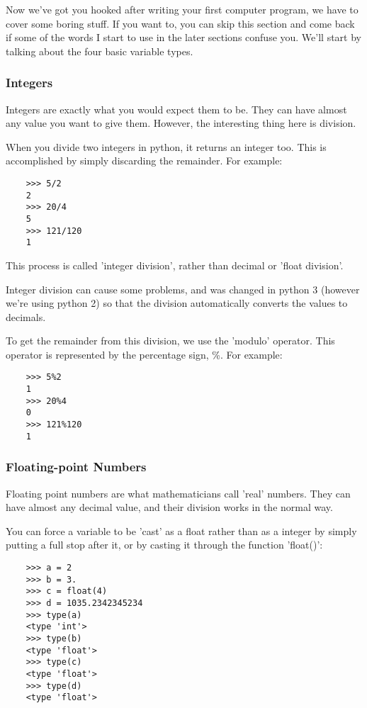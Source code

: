 Now we've got you hooked after writing your first computer program, we have to
cover some boring stuff. If you want to, you can skip this section and come back
if some of the words I start to use in the later sections confuse you. We'll
start by talking about the four basic variable types.

\subsubsection{Integers}

Integers are exactly what you would expect them to be. They can have almost any
value you want to give them. However, the interesting thing here is division.

When you divide two integers in python, it returns an integer too. This is
accomplished by simply discarding the remainder. For example:

\begin{lstlisting}
    >>> 5/2
    2
    >>> 20/4
    5
    >>> 121/120
    1
\end{lstlisting}

This process is called 'integer division', rather than decimal or 'float
division'.

Integer division can cause some problems, and was changed in python 3 (however
we're using python 2) so that the division automatically converts the values to
decimals.

To get the remainder from this division, we use the 'modulo' operator. This
operator is represented by the percentage sign, \%. For example:

\begin{lstlisting}
    >>> 5%2
    1
    >>> 20%4
    0
    >>> 121%120
    1
\end{lstlisting}

\subsubsection{Floating-point Numbers}

Floating point numbers are what mathematicians call 'real' numbers. They can
have almost any decimal value, and their division works in the normal way.

You can force a variable to be 'cast' as a float rather than as a integer by
simply putting a full stop after it, or by casting it through the function
'float()':

\begin{lstlisting}
    >>> a = 2
    >>> b = 3.
    >>> c = float(4)
    >>> d = 1035.2342345234
    >>> type(a)
    <type 'int'>
    >>> type(b)
    <type 'float'>
    >>> type(c)
    <type 'float'>
    >>> type(d)
    <type 'float'>
\end{lstlisting}

